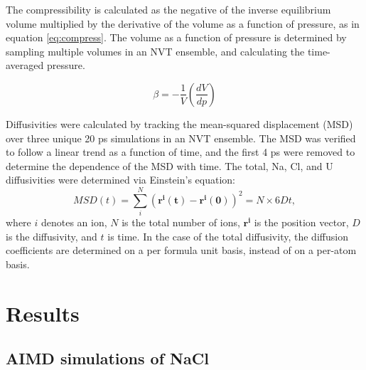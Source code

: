 \documentclass[preprint,3p,10pt,onecolumn,number,sort&compress]{elsarticle}
\begin{document}
The compressibility is calculated as the negative of the inverse equilibrium volume multiplied by the derivative of the volume as a function of pressure, as in equation \ref{eq:compress}. The volume as a function of pressure is determined by sampling multiple volumes in an NVT ensemble, and calculating the time-averaged pressure. 

\begin{equation}
\label{eq:compress}
\beta = -\frac{1}{V} {\left(\frac{dV}{dp}\right)}
\end{equation}

Diffusivities were calculated by tracking the mean-squared displacement (MSD) over three unique 20 ps simulations in an NVT ensemble. The MSD was verified to follow a linear trend as a function of time, and the first 4 ps were removed to determine the dependence of the MSD with time. The total, Na, Cl, and U diffusivities were determined via Einstein's equation:
\begin{equation}
MSD(t)=\sum_i^N (\mathbf{r^i(t)} - \mathbf{r^i(0)})^2 = N\times6Dt,
\end{equation}
where $i$ denotes an ion, $N$ is the total number of ions, $\mathbf{r^i}$ is the position vector, $D$ is the diffusivity, and $t$ is time. In the case of the total diffusivity, the diffusion coefficients are determined on a per formula unit basis, instead of on a per-atom basis. 


\section{Results}
\label{sec:results}
\subsection{AIMD simulations of NaCl}
\end{document}
